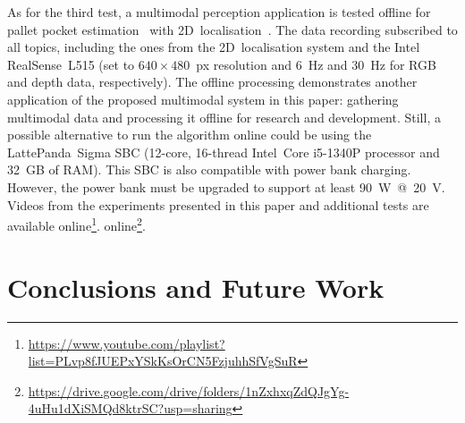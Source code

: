\documentclass[letterpaper,10pt,conference]{IEEEtran} %
\def\finalversion{}
\begin{document}
As for the third test, a multimodal perception application
is tested offline for pallet pocket estimation~\cite{caldana2024robot}
with 2D~localisation~\cite{sobreira2019jint}.
The data recording subscribed to all topics, including the ones from the
2D~localisation system and the Intel RealSense~L515
(set to $640\times480$~px resolution and 6~Hz and 30~Hz for RGB and depth data,
respectively). The offline processing demonstrates another application
of the proposed multimodal system in this paper:
gathering multimodal data and processing it offline for
research and development. Still, a possible alternative to run the algorithm
online could be using the LattePanda~Sigma SBC (12-core, 16-thread Intel~Core
i5-1340P processor and 32~GB of RAM). This SBC is also compatible with power
bank charging. However, the power bank must be upgraded to
support at least 90~W~@~20~V.
Videos from the experiments presented in this paper and additional tests
are available
\ifdefined\finalversion%
online\footnote{\href{https://www.youtube.com/playlist?list=PLvp8fJUEPxYSkKsOrCN5FzjuhhSfVgSuR}{https://www.youtube.com/playlist?\\list=PLvp8fJUEPxYSkKsOrCN5FzjuhhSfVgSuR}}.
\else%
online\footnote{\url{https://drive.google.com/drive/folders/1nZxhxqZdQJgYg-4uHu1dXiSMQd8ktrSC?usp=sharing}}.
\fi

%
%
% 
%






\section{Conclusions and Future Work}\label{sec:conclusion}
\end{document}
